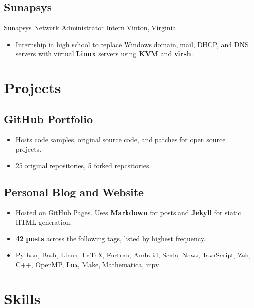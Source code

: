 \documentclass[11pt,letter,sans]{moderncv}
\begin{document}
    \subsection{Sunapsys}
      {Sunapsys}%
      {Network Administrator Intern}%
      {Vinton, Virginia}%
      {}%
      {
        \begin{itemize}
        \item Internship in high school to replace Windows domain, mail, DHCP, and DNS servers with virtual {\bf Linux} servers using {\bf KVM} and {\bf virsh}.\end{itemize}
      }
  
\section{ Projects }


  
    \subsection{GitHub Portfolio} %
    \begin{itemize}
    
      \item Hosts code samples, original source code, and patches for open source projects.
      \item 25 original repositories, 5 forked repositories.\end{itemize}
  
    \subsection{Personal Blog and Website} %
    \begin{itemize}
    
      \item Hosted on GitHub Pages. Uses {\bf Markdown} for posts and {\bf Jekyll} for static HTML generation.
      \item {\bf 42 posts} across the following tags, listed by highest frequency.
      \item Python, Bash, Linux, LaTeX, Fortran, Android, Scala, News, JavaScript, Zsh, C++, OpenMP, Lua, Make, Mathematica, mpv\end{itemize}
  
\section{ Skills }
\end{document}
